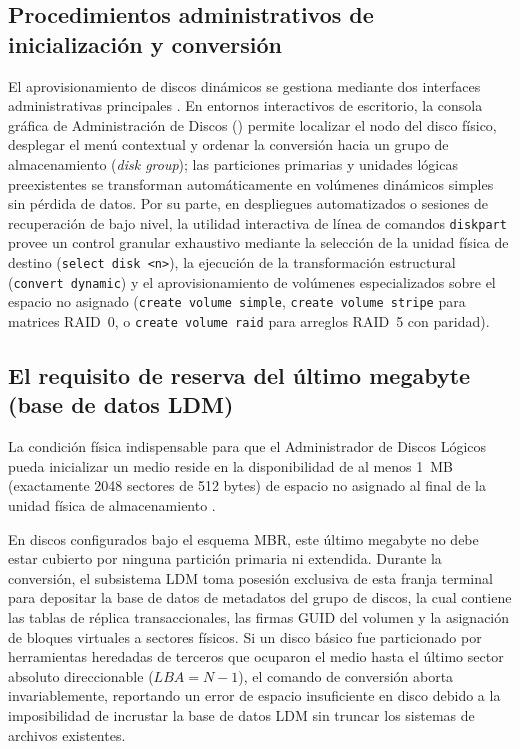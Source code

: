 \documentclass[12pt]{article}
\begin{document}
\subsection{Procedimientos administrativos de inicialización y conversión}
\label{subsec:procedimientosConversion}

El aprovisionamiento de discos dinámicos se gestiona mediante dos interfaces administrativas principales \parencite{microsoft2024basicdynamic, microsoft2024diskpart}. En entornos interactivos de escritorio, la consola gráfica de Administración de Discos () permite localizar el nodo del disco físico, desplegar el menú contextual y ordenar la conversión hacia un grupo de almacenamiento (\textit{disk group}); las particiones primarias y unidades lógicas preexistentes se transforman automáticamente en volúmenes dinámicos simples sin pérdida de datos. Por su parte, en despliegues automatizados o sesiones de recuperación de bajo nivel, la utilidad interactiva de línea de comandos \texttt{diskpart} provee un control granular exhaustivo mediante la selección de la unidad física de destino (\texttt{select disk <n>}), la ejecución de la transformación estructural (\texttt{convert dynamic}) y el aprovisionamiento de volúmenes especializados sobre el espacio no asignado (\texttt{create volume simple}, \texttt{create volume stripe} para matrices RAID~0, o \texttt{create volume raid} para arreglos RAID~5 con paridad).

\subsection{El requisito de reserva del último megabyte (base de datos LDM)}
\label{subsec:reservaMegabyteLdm}

La condición física indispensable para que el Administrador de Discos Lógicos pueda inicializar un medio reside en la disponibilidad de al menos 1~MB (exactamente 2048 sectores de 512 bytes) de espacio no asignado al final de la unidad física de almacenamiento \parencite{microsoft2024basicdynamic}. 

En discos configurados bajo el esquema MBR, este último megabyte no debe estar cubierto por ninguna partición primaria ni extendida. Durante la conversión, el subsistema LDM toma posesión exclusiva de esta franja terminal para depositar la base de datos de metadatos del grupo de discos, la cual contiene las tablas de réplica transaccionales, las firmas GUID del volumen y la asignación de bloques virtuales a sectores físicos. Si un disco básico fue particionado por herramientas heredadas de terceros que ocuparon el medio hasta el último sector absoluto direccionable ($LBA = N - 1$), el comando de conversión aborta invariablemente, reportando un error de espacio insuficiente en disco debido a la imposibilidad de incrustar la base de datos LDM sin truncar los sistemas de archivos existentes.
\end{document}
